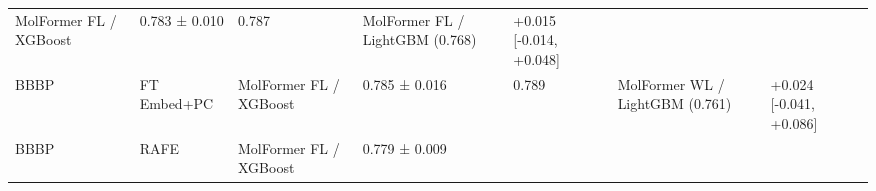 \documentclass[
  10pt,
]{article}
\begin{document}
\begin{longtable}[]{@{}lllllll@{}}
\begin{minipage}[t]{0.12\columnwidth}
MolFormer FL / XGBoost\strut
\end{minipage} & \begin{minipage}[t]{0.12\columnwidth}\raggedright
0.783 ± 0.010\strut
\end{minipage} & \begin{minipage}[t]{0.12\columnwidth}\raggedright
0.787\strut
\end{minipage} & \begin{minipage}[t]{0.12\columnwidth}\raggedright
MolFormer FL / LightGBM (0.768)\strut
\end{minipage} & \begin{minipage}[t]{0.12\columnwidth}\raggedright
+0.015 {[}-0.014, +0.048{]}\strut
\end{minipage}\tabularnewline
\begin{minipage}[t]{0.12\columnwidth}\raggedright
BBBP\strut
\end{minipage} & \begin{minipage}[t]{0.12\columnwidth}\raggedright
FT Embed+PC\strut
\end{minipage} & \begin{minipage}[t]{0.12\columnwidth}\raggedright
MolFormer FL / XGBoost\strut
\end{minipage} & \begin{minipage}[t]{0.12\columnwidth}\raggedright
0.785 ± 0.016\strut
\end{minipage} & \begin{minipage}[t]{0.12\columnwidth}\raggedright
0.789\strut
\end{minipage} & \begin{minipage}[t]{0.12\columnwidth}\raggedright
MolFormer WL / LightGBM (0.761)\strut
\end{minipage} & \begin{minipage}[t]{0.12\columnwidth}\raggedright
+0.024 {[}-0.041, +0.086{]}\strut
\end{minipage}\tabularnewline
\begin{minipage}[t]{0.12\columnwidth}\raggedright
BBBP\strut
\end{minipage} & \begin{minipage}[t]{0.12\columnwidth}\raggedright
RAFE\strut
\end{minipage} & \begin{minipage}[t]{0.12\columnwidth}\raggedright
MolFormer FL / XGBoost\strut
\end{minipage} & \begin{minipage}[t]{0.12\columnwidth}\raggedright
0.779 ± 0.009\strut
\end{minipage} & \begin{minipage}[t]{0.12\columnwidth}\raggedright

\end{minipage}
\end{longtable}
\end{document}
